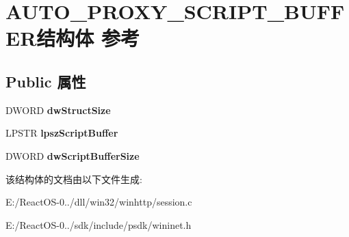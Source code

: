 \hypertarget{struct_a_u_t_o___p_r_o_x_y___s_c_r_i_p_t___b_u_f_f_e_r}{}\section{A\+U\+T\+O\+\_\+\+P\+R\+O\+X\+Y\+\_\+\+S\+C\+R\+I\+P\+T\+\_\+\+B\+U\+F\+F\+E\+R结构体 参考}
\label{struct_a_u_t_o___p_r_o_x_y___s_c_r_i_p_t___b_u_f_f_e_r}
\subsection*{Public 属性}
\begin{DoxyCompactItemize}
\item 
\mbox{\label{struct_a_u_t_o___p_r_o_x_y___s_c_r_i_p_t___b_u_f_f_e_r_a9232a41091c0082050347e7cf7e4b1c9}} 
D\+W\+O\+RD {\bfseries dw\+Struct\+Size}
\item 
\mbox{\label{struct_a_u_t_o___p_r_o_x_y___s_c_r_i_p_t___b_u_f_f_e_r_afa4097c6b03e69625f1c864ea81644c0}} 
L\+P\+S\+TR {\bfseries lpsz\+Script\+Buffer}
\item 
\mbox{\label{struct_a_u_t_o___p_r_o_x_y___s_c_r_i_p_t___b_u_f_f_e_r_ae0f2e4d051c1df1145b735d52afdde69}} 
D\+W\+O\+RD {\bfseries dw\+Script\+Buffer\+Size}
\end{DoxyCompactItemize}


该结构体的文档由以下文件生成\+:\begin{DoxyCompactItemize}
\item 
E\+:/\+React\+O\+S-\/0../dll/win32/winhttp/session.\+c\item 
E\+:/\+React\+O\+S-\/0../sdk/include/psdk/wininet.\+h\end{DoxyCompactItemize}
